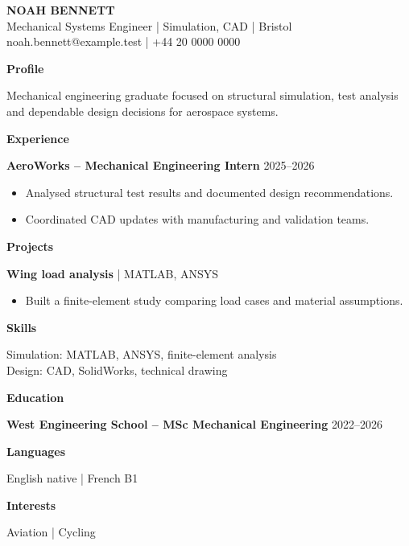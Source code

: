 \documentclass[10pt,a4paper]{article}
\newcommand{\cvsection}[1]{\par\vspace{5pt}\textbf{\large #1}\par\vspace{2pt}}
\begin{document}
\begin{center}
{\Large\textbf{NOAH BENNETT}}\\
Mechanical Systems Engineer | Simulation, CAD | Bristol\\
noah.bennett@example.test | +44 20 0000 0000
\end{center}

\cvsection{Profile}
Mechanical engineering graduate focused on structural simulation, test analysis and dependable design decisions for aerospace systems.

\cvsection{Experience}
\textbf{AeroWorks -- Mechanical Engineering Intern} \hfill 2025--2026
\begin{itemize}[leftmargin=*,nosep]
\item Analysed structural test results and documented design recommendations.
\item Coordinated CAD updates with manufacturing and validation teams.
\end{itemize}

\cvsection{Projects}
\textbf{Wing load analysis} | MATLAB, ANSYS
\begin{itemize}[leftmargin=*,nosep]
\item Built a finite-element study comparing load cases and material assumptions.
\end{itemize}

\cvsection{Skills}
Simulation: MATLAB, ANSYS, finite-element analysis\\
Design: CAD, SolidWorks, technical drawing

\cvsection{Education}
\textbf{West Engineering School -- MSc Mechanical Engineering} \hfill 2022--2026

\cvsection{Languages}
English native | French B1

\cvsection{Interests}
Aviation | Cycling
\end{document}
